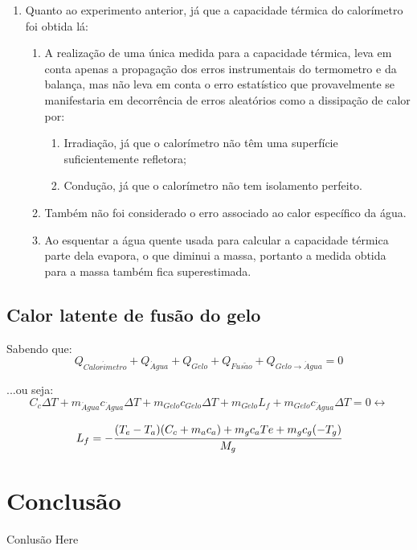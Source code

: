 \documentclass[a4paper]{article}
\begin{document}
\begin{enumerate}
\begin{enumerate}
						\item
					\end{enumerate}
					\item Quanto ao experimento anterior, já que a capacidade térmica do calorímetro foi obtida lá:
					\begin{enumerate}
						\item A realização de uma única medida para a capacidade térmica, leva em conta apenas a propagação dos erros instrumentais do termometro e da balança, mas não leva em conta o erro estatístico que provavelmente se manifestaria em decorrência de erros aleatórios como a dissipação de calor por:
						\begin{enumerate}
							\item Irradiação, já que o calorímetro não têm uma superfície suficientemente refletora;
							\item Condução, já que o calorímetro não tem isolamento perfeito.
						\end{enumerate}
						\item Também não foi considerado o erro associado ao calor específico da água.
						\item Ao esquentar a água quente usada para calcular a capacidade térmica parte dela evapora, o que diminui a massa, portanto a medida obtida para a massa também fica superestimada.

					\end{enumerate}
				\end{enumerate}

		\subsection{Calor latente de fusão do gelo}
			Sabendo que:
			\begin{equation}
				Q_{Calor\acute{i}metro} + Q_{\acute{A}gua} + Q_{Gelo} + Q_{Fus\tilde{a}o} + Q_{Gelo \rightarrow \acute{A}gua} = 0
			\end{equation}
			
			...ou seja:
			\hspace{-2cm}%
			$$ C_{c}\Delta T + m_{\acute{A}gua}c_{\acute{A}gua}\Delta T + m_{Gelo}c_{Gelo}\Delta T +  m_{Gelo}L_{f} + m_{Gelo}c_{\acute{A}gua}\Delta T = 0 \leftrightarrow$$
			
			  $$L_{f} = -\cfrac{(T_{e}-T_{a})(C_{c}+m_{a}c_{a}) + m_{g}c_{a}T{e} + m_{g}c_{g}(-T_{g})}{M_g}$$
			
	\section{Conclusão}

		Conlusão Here 
\end{document}
